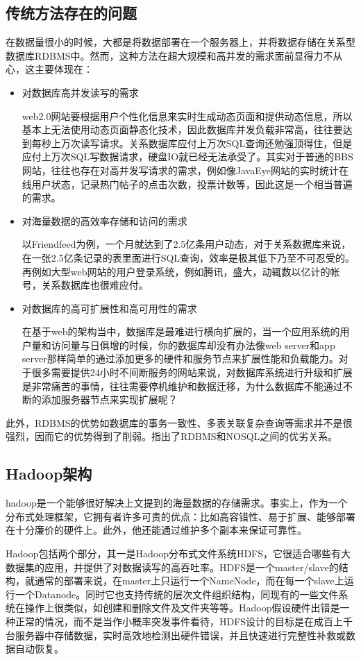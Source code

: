 \subsection{传统方法存在的问题}
  在数据量很小的时候，大都是将数据部署在一个服务器上，并将数据存储在关系型数据库RDBMS中。然而，这种方法在超大规模和高并发的需求面前显得力不从心，这主要体现在：
\begin{itemize}
\item 对数据库高并发读写的需求

  web2.0网站要根据用户个性化信息来实时生成动态页面和提供动态信息，所以基本上无法使用动态页面静态化技术，因此数据库并发负载非常高，往往要达到每秒上万次读写请求。关系数据库应付上万次SQL查询还勉强顶得住，但是应付上万次SQL写数据请求，硬盘IO就已经无法承受了。其实对于普通的BBS网站，往往也存在对高并发写请求的需求，例如像JavaEye网站的实时统计在线用户状态，记录热门帖子的点击次数，投票计数等，因此这是一个相当普遍的需求。 
\item  对海量数据的高效率存储和访问的需求

  以Friendfeed为例，一个月就达到了2.5亿条用户动态，对于关系数据库来说，在一张2.5亿条记录的表里面进行SQL查询，效率是极其低下乃至不可忍受的。再例如大型web网站的用户登录系统，例如腾讯，盛大，动辄数以亿计的帐号，关系数据库也很难应付。 
\item 对数据库的高可扩展性和高可用性的需求

  在基于web的架构当中，数据库是最难进行横向扩展的，当一个应用系统的用户量和访问量与日俱增的时候，你的数据库却没有办法像web server和app server那样简单的通过添加更多的硬件和服务节点来扩展性能和负载能力。对于很多需要提供24小时不间断服务的网站来说，对数据库系统进行升级和扩展是非常痛苦的事情，往往需要停机维护和数据迁移，为什么数据库不能通过不断的添加服务器节点来实现扩展呢？ 
\end{itemize}
  此外，RDBMS的优势如数据库的事务一致性、多表关联复杂查询等需求并不是很强烈，因而它的优势得到了削弱。\cite{MSU-CSE-99-39}指出了RDBMS和NOSQL之间的优劣关系。

\subsection{Hadoop架构}
  hadoop是一个能够很好解决上文提到的海量数据的存储需求。事实上，作为一个分布式处理框架，它拥有者许多可贵的优点：比如高容错性、易于扩展、能够部署在十分廉价的硬件上。此外，他还能通过维护多个副本来保证可靠性。


  Hadoop包括两个部分，其一是Hadoop分布式文件系统HDFS，它很适合哪些有大数据集的应用，并提供了对数据读写的高吞吐率。HDFS是一个master/slave的结构，就通常的部署来说，在master上只运行一个NameNode，而在每一个slave上运行一个Datanode。同时它也支持传统的层次文件组织结构，同现有的一些文件系统在操作上很类似，如创建和删除文件及文件夹等等。Hadoop假设硬件出错是一种正常的情况，而不是当作小概率突发事件看待，HDFS设计的目标是在成百上千台服务器中存储数据，实时高效地检测出硬件错误，并且快速进行完整性补救或数据自动恢复。



